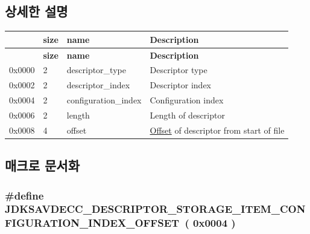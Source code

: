 \subsection{상세한 설명}
\tabulinesep=1mm
\begin{longtabu} spread 0pt [c]{*4{|X[-1]}|}
\hline
{}&{\bf size }&{\bf name }&{\bf Description  }\\
\endfirsthead
\hline
\endfoot
\hline
{}&{\bf size }&{\bf name }&{\bf Description  }\\
\endhead
0x0000 &2 &descriptor\+\_\+type &Descriptor type \\
0x0002 &2 &descriptor\+\_\+index &Descriptor index \\
0x0004 &2 &configuration\+\_\+index &Configuration index \\
0x0006 &2 &length &Length of descriptor \\
0x0008 &4 &offset &\hyperlink{class_offset}{Offset} of descriptor from start of file \\
\end{longtabu}


\subsection{매크로 문서화}
\subsubsection[{\texorpdfstring{J\+D\+K\+S\+A\+V\+D\+E\+C\+C\+\_\+\+D\+E\+S\+C\+R\+I\+P\+T\+O\+R\+\_\+\+S\+T\+O\+R\+A\+G\+E\+\_\+\+I\+T\+E\+M\+\_\+\+C\+O\+N\+F\+I\+G\+U\+R\+A\+T\+I\+O\+N\+\_\+\+I\+N\+D\+E\+X\+\_\+\+O\+F\+F\+S\+ET}{JDKSAVDECC_DESCRIPTOR_STORAGE_ITEM_CONFIGURATION_INDEX_OFFSET}}]{\setlength{\rightskip}{0pt plus 5cm}\#define J\+D\+K\+S\+A\+V\+D\+E\+C\+C\+\_\+\+D\+E\+S\+C\+R\+I\+P\+T\+O\+R\+\_\+\+S\+T\+O\+R\+A\+G\+E\+\_\+\+I\+T\+E\+M\+\_\+\+C\+O\+N\+F\+I\+G\+U\+R\+A\+T\+I\+O\+N\+\_\+\+I\+N\+D\+E\+X\+\_\+\+O\+F\+F\+S\+ET~( 0x0004 )}\hypertarget{group__descriptor__storage__item_ga7206999291660720b4a417c04b96c57b}{}\label{group__descriptor__storage__item_ga7206999291660720b4a417c04b96c57b}


